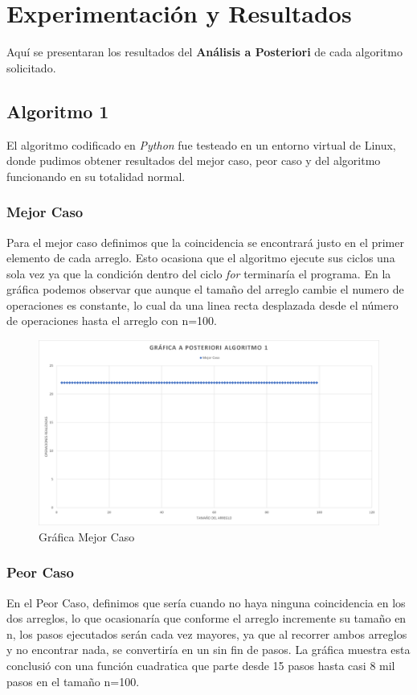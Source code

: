 \chapter{Experimentación y Resultados}
    Aquí se presentaran los resultados del \textbf{Análisis a Posteriori} de cada algoritmo solicitado.
    
\section{Algoritmo 1}
    El algoritmo codificado en \textit{Python} fue testeado en un entorno virtual de Linux, donde pudimos obtener resultados del mejor caso, peor caso y del algoritmo funcionando en su totalidad normal. 
    \subsection{Mejor Caso}
        Para el mejor caso definimos que la coincidencia se encontrará justo en el primer elemento de cada arreglo. Esto ocasiona que el algoritmo ejecute sus ciclos una sola vez ya que la condición dentro del ciclo \textit{for} terminaría el programa. 
        En la gráfica podemos observar que aunque el tamaño del arreglo cambie el numero de operaciones es constante, lo cual da una linea recta desplazada desde el número de operaciones hasta el arreglo con n=100.
        
        \begin{figure}[htp!]
            \centering
            \includegraphics[width=0.8 \textwidth]{Images/Graf_MejorCaso.png}
            \caption{Gráfica Mejor Caso}
            \label{fig:my_label}
        \end{figure}
    
        
    \subsection{Peor Caso}
        En el Peor Caso, definimos que sería cuando no haya ninguna coincidencia en los dos arreglos, lo que ocasionaría que conforme el arreglo incremente su tamaño en n, los pasos ejecutados serán cada vez mayores, ya que al recorrer ambos arreglos y no encontrar nada, se convertiría en un sin fin de pasos. 
        La gráfica muestra esta conclusió con una función cuadratica que parte desde 15 pasos hasta casi 8 mil pasos en el tamaño n=100.
        

